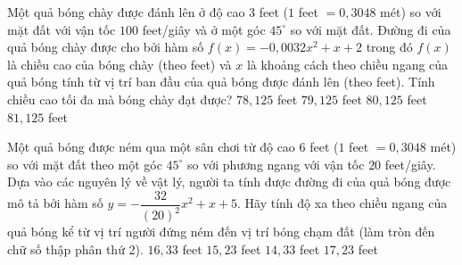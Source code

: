 \begin{ex}%
	Một quả bóng chày được đánh lên ở độ cao $3$ feet ($1$ feet $ = 0,3048$ mét) so với mặt đất với vận tốc $100$ feet/giây và ở một góc $45^\circ$ so với mặt đất. Đường đi của quả bóng chày được cho bởi hàm số $f(x)=-0,0032x^2+x+2$ trong đó $f(x)$ là chiều cao của bóng chày (theo feet) và $x$ là khoảng cách theo chiều ngang của quả bóng tính từ vị trí ban đầu của quả bóng được đánh lên (theo feet). Tính chiều cao tối đa mà bóng chày đạt được?
	\choice
	{$78,125$ feet}
	{$79,125$ feet}
	{\True $80,125$ feet}
	{$81,125$ feet}
\end{ex}

\begin{ex}%
	Một quả bóng được ném qua một sân chơi từ độ cao $6$ feet ($1$ feet $ = 0,3048$ mét) so với mặt đất theo một góc $45^\circ$ so với phương ngang với vận tốc $20$ feet/giây. Dựa vào các nguyên lý về vật lý, người ta tính được đường đi của quả bóng được mô tả bởi hàm số $\displaystyle y=-\dfrac{32}{(20)^2}x^2+x+5$. Hãy tính độ xa theo chiều ngang của quả bóng kể từ vị trí người đứng ném đến vị trí bóng chạm đất (làm tròn đến chữ số thập phân thứ 2).
	\choice
	{$16,33$ feet}
	{\True $15,23$ feet}
	{$14,33$ feet}
	{$17,23$ feet}
\end{ex}

